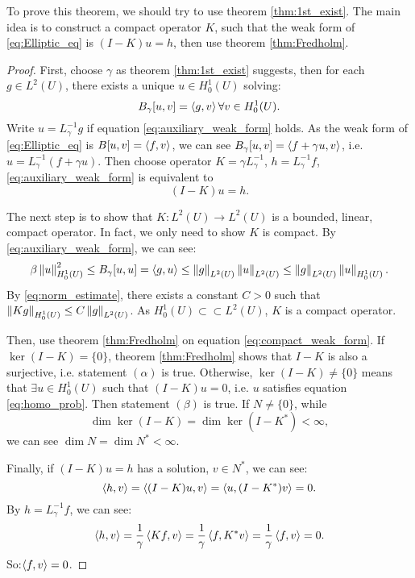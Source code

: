 \begin{remark}
    To prove this theorem, we should try to use theorem \ref{thm:1st_exist}. The main idea is to construct a compact operator $K$, such that the weak form of \eqref{eq:Elliptic_eq} is $(I-K)u=h$, then use theorem \ref{thm:Fredholm}.
\end{remark}
\begin{proof}
    First, choose $\gamma$ as theorem \ref{thm:1st_exist} suggests, then for each $g\in L^{2}(U)$, there exists a unique $u\in H_{0}^{1}(U)$ solving:
    \begin{equation}
        \label{eq:auxiliary_weak_form}
        B_{\gamma}[u,v]=\left<g,v\right>\forall v\in H_{0}^{1}(U).
    \end{equation}
    Write $u=L_{\gamma}^{-1}g$ if equation \eqref{eq:auxiliary_weak_form} holds. As the weak form of \eqref{eq:Elliptic_eq} is $B[u,v]=\left<f,v\right>$, we can see $B_{\gamma}[u,v]=\left<f+\gamma u,v\right>$, i.e. $u=L_{\gamma}^{-1}(f+\gamma u)$. Then choose operator $K=\gamma L_{\gamma}^{-1}$, $h=L_{\gamma}^{-1}f$, \eqref{eq:auxiliary_weak_form} is equivalent to 
    \begin{equation}
        \label{eq:compact_weak_form}
        (I-K)u=h.
    \end{equation}

    The next step is to show that $K:L^{2}(U)\rightarrow L^{2}(U)$ is a bounded, linear, compact operator. In fact, we only need to show $K$ is compact. By \eqref{eq:auxiliary_weak_form}, we can see:
    \begin{equation}
        \label{eq:norm_estimate}
        \beta\left\|u\right\|_{H_{0}^{1}(U)}^{2}\le B_{\gamma}[u,u]=\left<g,u\right>\le\left\|g\right\|_{L^{2}(U)}\left\|u\right\|_{L^{2}(U)}\le\left\|g\right\|_{L^{2}(U)}\left\|u\right\|_{H_{0}^{1}(U)}.
    \end{equation}
    By \eqref{eq:norm_estimate}, there exists a constant $C>0$ such that $\left\|Kg\right\|_{H_{0}^{1}(U)}\le C\left\|g\right\|_{L^{2}(U)}$. As $H_{0}^{1}(U)\subset\subset L^{2}(U)$, $K$ is a compact operator.

    Then, use theorem \ref{thm:Fredholm} on equation \eqref{eq:compact_weak_form}. If $\ker(I-K)=\{0\}$, theorem \ref{thm:Fredholm} shows that $I-K$ is also a surjective, i.e. statement $(\alpha)$ is true. Otherwise, $\ker(I-K)\neq\{0\}$ means that $\exists u\in H_{0}^{1}(U)$ such that $(I-K)u=0$, i.e. $u$ satisfies equation \eqref{eq:homo_prob}. Then statement $(\beta)$ is true. If $N\neq\{0\}$, while
    \begin{equation}\dim\ker(I-K)=\dim\ker(I-K^{*})<\infty,
    \end{equation} we can see $\dim N=\dim N^{*}<\infty$.

    Finally, if $(I-K)u=h$ has a solution, $v\in N^{*}$, we can see:
    \begin{equation}
        \left<h,v\right>=\left<(I-K)u,v\right>=\left<u,(I-K^{*})v\right>=0.
    \end{equation}
    By $h=L_{\gamma}^{-1}f$, we can see:
    \begin{equation}
        \left<h,v\right>=\frac{1}{\gamma}\left<Kf,v\right>=\frac{1}{\gamma}\left<f,K^{*}v\right>=\frac{1}{\gamma}\left<f,v\right>=0.
    \end{equation}
    So:$\left<f,v\right>=0$.
\end{proof}
